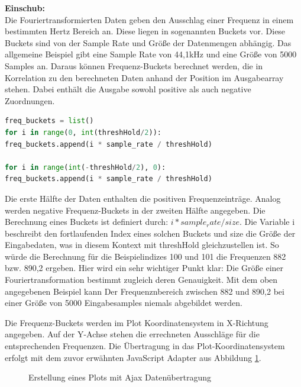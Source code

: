 \begin{addmargin}[1cm]{1cm}
\textbf{Einschub:}\\
Die Fouriertransformierten Daten geben den Ausschlag einer Frequenz in einem bestimmten Hertz Bereich an. Diese liegen in sogenannten Buckets vor. Diese Buckets sind von der Sample Rate und Größe der Datenmengen abhängig. Das allgemeine Beispiel gibt eine Sample Rate von 44,1kHz und eine Größe von 5000 Samples an. Daraus können Frequenz-Buckets berechnet werden, die in Korrelation zu den berechneten Daten anhand der Position im Ausgabearray stehen.  Dabei enthält die Ausgabe sowohl positive als auch negative Zuordnungen.
\begin{lstlisting}[language=Python, frame=none, numbers=none]
freq_buckets = list()
for i in range(0, int(threshHold/2)):
freq_buckets.append(i * sample_rate / threshHold)

for i in range(int(-threshHold/2), 0):
freq_buckets.append(i * sample_rate / threshHold)
\end{lstlisting}

Die erste Hälfte der Daten enthalten die positiven Frequenzeinträge. Analog werden negative Frequenz-Buckets in der zweiten Hälfte angegeben. Die Berechnung eines Buckets ist definiert durch: $i * sample_rate / size$. Die Variable i beschreibt den fortlaufenden Index eines solchen Buckets und size die Größe der Eingabedaten, was in diesem Kontext mit threshHold gleichzustellen ist. So würde die Berechnung für die Beispielindizes 100 und 101 die Frequenzen 882 bzw. 890,2 ergeben. Hier wird ein sehr wichtiger Punkt klar: Die Größe einer Fouriertransformation bestimmt zugleich deren Genauigkeit. Mit dem oben angegebenen Beispiel kann Der Frequenznbereich zwischen 882 und 890,2 bei einer Größe von 5000 Eingabesamples niemals abgebildet werden.
\end{addmargin}

Die Frequenz-Buckets werden im Plot Koordinatensystem in X-Richtung angegeben. Auf der Y-Achse stehen die errechneten Ausschläge für die entsprechenden Frequenzen. 
Die Übertragung in das Plot-Koordinatensystem erfolgt mit dem zuvor erwähnten JavaScript Adapter aus Abbildung \ref{fig:bokehPlot}. 

\begin{figure}[t!]
	
	\caption{Erstellung eines Plots mit Ajax Datenübertragung}
	\label{fig:bokehPlot}
\end{figure}

